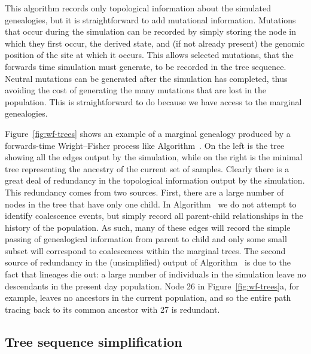 \documentclass{article}
\begin{document}
This algorithm records only topological information about the simulated genealogies,
but it is straightforward to add mutational information.
Mutations that occur during the simulation can be recorded
by simply storing the node in which they first occur, the derived state,
and (if not already present) the genomic position of the site at which it occurs.
This allows selected mutations, that the forwards time simulation must generate,
to be recorded in the tree sequence.
Neutral mutations can be generated after the simulation has completed, thus
avoiding the cost of generating the many mutations that are lost in the population.
This is straightforward to do because we have access to the marginal genealogies.

Figure~\ref{fig:wf-trees} shows
an example of a marginal genealogy produced by a forwards-time Wright--Fisher
process like Algorithm~.
On the left is the tree showing all the edges output by the simulation,
while on the right
is the minimal tree representing the ancestry of the current set of samples.
Clearly there is a great deal of redundancy in the topological
information output by the simulation.
This redundancy comes from two sources.
First, there are a large number of nodes in the tree that have only one child.
In Algorithm~ we do not attempt to identify coalescence events,
but simply record all parent-child
relationships in the history of the population.
As such, many of these edges
will record the simple passing of genealogical information from parent to child
and only some small subset will correspond to coalescences within the marginal
trees. The second source of redundancy in the (unsimplified) output of Algorithm~
is due to the fact that lineages die out: a large number of
individuals in the simulation leave no descendants in the present day population.
Node 26 in Figure~\ref{fig:wf-trees}a, for example, leaves no
ancestors in the current population, and so the entire path tracing back to
its common ancestor with 27 is redundant.

\subsection*{Tree sequence simplification}
\label{ss:simplify}
\end{document}

